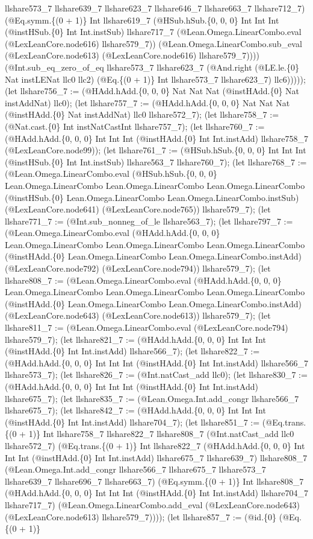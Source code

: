 \documentclass[11pt]{article}
\begin{document}
llshare573\_7 llshare639\_7 llshare623\_7 llshare646\_7 llshare663\_7 llshare712\_7) (@Eq.symm.\{(0 + 1)\} Int llshare619\_7 (@HSub.hSub.\{0, 0, 0\} Int Int Int (@instHSub.\{0\} Int Int.instSub) llshare717\_7 (@Lean.Omega.LinearCombo.eval (@LexLeanCore.node616) llshare579\_7)) (@Lean.Omega.LinearCombo.sub\_eval (@LexLeanCore.node613) (@LexLeanCore.node616) llshare579\_7)))) (@Int.sub\_eq\_zero\_of\_eq llshare573\_7 llshare623\_7 (@And.right (@LE.le.\{0\} Nat instLENat llc0 llc2) (@Eq.\{(0 + 1)\} Int llshare573\_7 llshare623\_7) llc6))))); (let llshare756\_7 := (@HAdd.hAdd.\{0, 0, 0\} Nat Nat Nat (@instHAdd.\{0\} Nat instAddNat) llc0); (let llshare757\_7 := (@HAdd.hAdd.\{0, 0, 0\} Nat Nat Nat (@instHAdd.\{0\} Nat instAddNat) llc0 llshare572\_7); (let llshare758\_7 := (@Nat.cast.\{0\} Int instNatCastInt llshare757\_7); (let llshare760\_7 := (@HAdd.hAdd.\{0, 0, 0\} Int Int Int (@instHAdd.\{0\} Int Int.instAdd) llshare758\_7 (@LexLeanCore.node99)); (let llshare761\_7 := (@HSub.hSub.\{0, 0, 0\} Int Int Int (@instHSub.\{0\} Int Int.instSub) llshare563\_7 llshare760\_7); (let llshare768\_7 := (@Lean.Omega.LinearCombo.eval (@HSub.hSub.\{0, 0, 0\} Lean.Omega.LinearCombo Lean.Omega.LinearCombo Lean.Omega.LinearCombo (@instHSub.\{0\} Lean.Omega.LinearCombo Lean.Omega.LinearCombo.instSub) (@LexLeanCore.node641) (@LexLeanCore.node765)) llshare579\_7); (let llshare771\_7 := (@Int.sub\_nonneg\_of\_le llshare563\_7); (let llshare797\_7 := (@Lean.Omega.LinearCombo.eval (@HAdd.hAdd.\{0, 0, 0\} Lean.Omega.LinearCombo Lean.Omega.LinearCombo Lean.Omega.LinearCombo (@instHAdd.\{0\} Lean.Omega.LinearCombo Lean.Omega.LinearCombo.instAdd) (@LexLeanCore.node792) (@LexLeanCore.node794)) llshare579\_7); (let llshare808\_7 := (@Lean.Omega.LinearCombo.eval (@HAdd.hAdd.\{0, 0, 0\} Lean.Omega.LinearCombo Lean.Omega.LinearCombo Lean.Omega.LinearCombo (@instHAdd.\{0\} Lean.Omega.LinearCombo Lean.Omega.LinearCombo.instAdd) (@LexLeanCore.node643) (@LexLeanCore.node613)) llshare579\_7); (let llshare811\_7 := (@Lean.Omega.LinearCombo.eval (@LexLeanCore.node794) llshare579\_7); (let llshare821\_7 := (@HAdd.hAdd.\{0, 0, 0\} Int Int Int (@instHAdd.\{0\} Int Int.instAdd) llshare566\_7); (let llshare822\_7 := (@HAdd.hAdd.\{0, 0, 0\} Int Int Int (@instHAdd.\{0\} Int Int.instAdd) llshare566\_7 llshare573\_7); (let llshare826\_7 := (@Int.natCast\_add llc0); (let llshare830\_7 := (@HAdd.hAdd.\{0, 0, 0\} Int Int Int (@instHAdd.\{0\} Int Int.instAdd) llshare675\_7); (let llshare835\_7 := (@Lean.Omega.Int.add\_congr llshare566\_7 llshare675\_7); (let llshare842\_7 := (@HAdd.hAdd.\{0, 0, 0\} Int Int Int (@instHAdd.\{0\} Int Int.instAdd) llshare704\_7); (let llshare851\_7 := (@Eq.trans.\{(0 + 1)\} Int llshare758\_7 llshare822\_7 llshare808\_7 (@Int.natCast\_add llc0 llshare572\_7) (@Eq.trans.\{(0 + 1)\} Int llshare822\_7 (@HAdd.hAdd.\{0, 0, 0\} Int Int Int (@instHAdd.\{0\} Int Int.instAdd) llshare675\_7 llshare639\_7) llshare808\_7 (@Lean.Omega.Int.add\_congr llshare566\_7 llshare675\_7 llshare573\_7 llshare639\_7 llshare696\_7 llshare663\_7) (@Eq.symm.\{(0 + 1)\} Int llshare808\_7 (@HAdd.hAdd.\{0, 0, 0\} Int Int Int (@instHAdd.\{0\} Int Int.instAdd) llshare704\_7 llshare717\_7) (@Lean.Omega.LinearCombo.add\_eval (@LexLeanCore.node643) (@LexLeanCore.node613) llshare579\_7)))); (let llshare857\_7 := (@id.\{0\} (@Eq.\{(0 + 1)\} 
\end{document}
